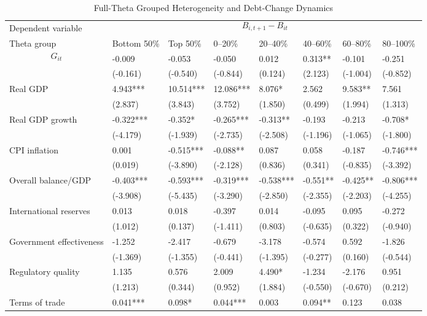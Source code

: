 \begin{table}[H]\centering
\begin{threeparttable}
\caption{Full-Theta Grouped Heterogeneity and Debt-Change Dynamics}
\label{tab:theta_group_heterogeneity_debt}
\scriptsize
\begin{tabularx}{\textwidth}{lYYYYYYY}
\toprule
Dependent variable &  \\
\cmidrule(lr){2-8}
Theta group & Bottom 50\% & Top 50\% & 0--20\% & 20--40\% & 40--60\% & 60--80\% & 80--100\% \\
\midrule
$$G_{it}$$ & -0.009 & -0.053 & -0.050 & 0.012 & 0.313** & -0.101 & -0.251 \\
  & (-0.161) & (-0.540) & (-0.844) & (0.124) & (2.123) & (-1.004) & (-0.852) \\
Real GDP & 4.943*** & 10.514*** & 12.086*** & 8.076* & 2.562 & 9.583** & 7.561 \\
  & (2.837) & (3.843) & (3.752) & (1.850) & (0.499) & (1.994) & (1.313) \\
Real GDP growth & -0.322*** & -0.352* & -0.265*** & -0.313** & -0.193 & -0.213 & -0.708* \\
  & (-4.179) & (-1.939) & (-2.735) & (-2.508) & (-1.196) & (-1.065) & (-1.800) \\
CPI inflation & 0.001 & -0.515*** & -0.088** & 0.087 & 0.058 & -0.187 & -0.746*** \\
  & (0.019) & (-3.890) & (-2.128) & (0.836) & (0.341) & (-0.835) & (-3.392) \\
Overall balance/GDP & -0.403*** & -0.593*** & -0.319*** & -0.538*** & -0.551** & -0.425** & -0.806*** \\
  & (-3.908) & (-5.435) & (-3.290) & (-2.850) & (-2.355) & (-2.203) & (-4.255) \\
International reserves & 0.013 & 0.018 & -0.397 & 0.014 & -0.095 & 0.095 & -0.272 \\
  & (1.012) & (0.137) & (-1.411) & (0.803) & (-0.635) & (0.322) & (-0.940) \\
Government effectiveness & -1.252 & -2.417 & -0.679 & -3.178 & -0.574 & 0.592 & -1.826 \\
  & (-1.369) & (-1.355) & (-0.441) & (-1.395) & (-0.277) & (0.160) & (-0.544) \\
Regulatory quality & 1.135 & 0.576 & 2.009 & 4.490* & -1.234 & -2.176 & 0.951 \\
  & (1.213) & (0.344) & (0.952) & (1.884) & (-0.550) & (-0.670) & (0.212) \\
Terms of trade & 0.041*** & 0.098* & 0.044*** & 0.003 & 0.094** & 0.123 & 0.038 \\

\end{tabularx}
\end{threeparttable}
\end{table}
